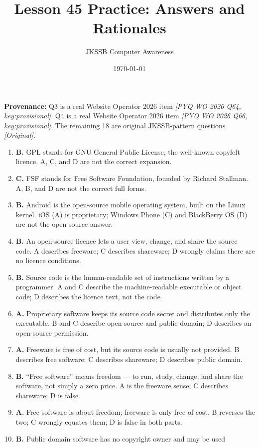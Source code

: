 \documentclass[11pt]{article}
\title{Lesson 45 Practice: Answers and Rationales}
\author{JKSSB Computer Awareness}
\date{\today}
\begin{document}
\maketitle
\noindent\textbf{Provenance:} Q3 is a real Website Operator 2026 item
\textit{[PYQ WO 2026 Q64, key:provisional]}. Q4 is a real Website Operator 2026
item \textit{[PYQ WO 2026 Q66, key:provisional]}. The remaining 18 are original
JKSSB-pattern questions \textit{[Original]}.
\begin{enumerate}[label=\textbf{Q\arabic*.}, leftmargin=*]
\item \textbf{B.} GPL stands for GNU General Public License, the well-known
  copyleft licence. A, C, and D are not the correct expansion.
\item \textbf{C.} FSF stands for Free Software Foundation, founded by Richard
  Stallman. A, B, and D are not the correct full forms.
\item \textbf{B.} Android is the open-source mobile operating system, built on
  the Linux kernel. iOS (A) is proprietary; Windows Phone (C) and BlackBerry OS
  (D) are not the open-source answer.
\item \textbf{B.} An open-source licence lets a user view, change, and share
  the source code. A describes freeware; C describes shareware; D wrongly
  claims there are no licence conditions.
\item \textbf{B.} Source code is the human-readable set of instructions written
  by a programmer. A and C describe the machine-readable executable or object
  code; D describes the licence text, not the code.
\item \textbf{A.} Proprietary software keeps its source code secret and
  distributes only the executable. B and C describe open source and public
  domain; D describes an open-source permission.
\item \textbf{A.} Freeware is free of cost, but its source code is usually not
  provided. B describes free software; C describes shareware; D describes
  public domain.
\item \textbf{B.} ``Free software'' means freedom --- to run, study, change,
  and share the software, not simply a zero price. A is the freeware sense; C
  describes shareware; D is false.
\item \textbf{A.} Free software is about freedom; freeware is only free of
  cost. B reverses the two; C wrongly equates them; D is false in both parts.
\item \textbf{B.} Public domain software has no copyright owner and may be used

\end{enumerate}
\end{document}

